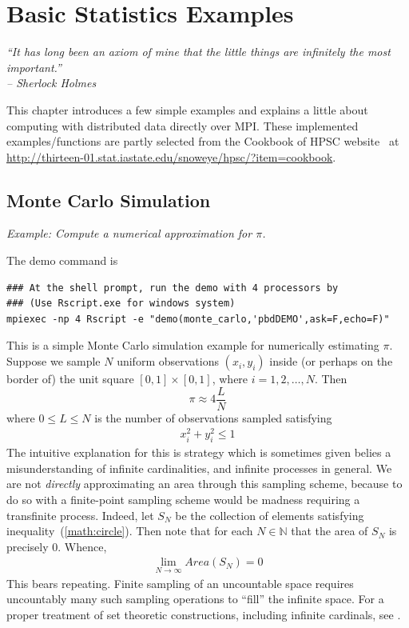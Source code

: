 \chapter[Basic Statistics Examples]{Basic Statistics Examples}
\label{sec:statistics_examples}

{\it
``It has long been an axiom of mine that the little things are
infinitely the most important.'' \\
\--- Sherlock Holmes
}
\vspace{0.5cm}


This chapter introduces a few simple examples and explains a little about
computing with distributed data directly over MPI. 
These implemented examples/functions are partly
selected from the Cookbook of HPSC website~\citep{hpsc2011} at
\url{http://thirteen-01.stat.iastate.edu/snoweye/hpsc/?item=cookbook}.



\section[Monte Carlo Simulation]{Monte Carlo Simulation}%
\label{sec:monte_carlo}

\emph{Example:  Compute a numerical approximation for $\pi$.}

The demo command is
\begin{lstlisting}
### At the shell prompt, run the demo with 4 processors by
### (Use Rscript.exe for windows system)
mpiexec -np 4 Rscript -e "demo(monte_carlo,'pbdDEMO',ask=F,echo=F)"
\end{lstlisting}

This is a simple Monte Carlo simulation example for numerically estimating
$\pi$.
Suppose we sample $N$ uniform observations $(x_i, y_i)$ inside (or perhaps on
the border of) the unit square $[0, 1]\times [0,1]$,
where $i = 1, 2, \ldots, N$.  Then
\begin{equation}
\pi \approx 4\frac{L}{N}
\label{eqn:pi}
\end{equation}
where $0\leq L\leq N$ is the number of observations sampled satisfying
\begin{align}
x_i^2+y_i^2 \leq 1\label{math:circle}
\end{align}
The intuitive explanation for this is strategy which is sometimes given belies
a misunderstanding of infinite cardinalities, and infinite processes in
general. We are not \emph{directly} approximating an area through this
sampling scheme, because to do so with a finite-point sampling scheme would
be madness requiring a transfinite process. Indeed, let $S_N$ be the
collection of elements satisfying inequality~(\ref{math:circle}).
Then note that for each $N\in\mathbb{N}$ that the area of $S_N$ is
precisely 0. Whence,
\begin{align*}
\lim_{N\rightarrow\infty} Area(S_N) = 0
\end{align*}
This bears repeating. Finite sampling of an uncountable space requires
uncountably many such sampling operations to ``fill'' the infinite space.
For a proper treatment of set theoretic constructions, including infinite
cardinals, see \citep{kunen}.

